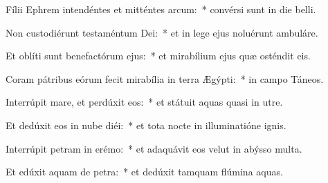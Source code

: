 
\item Fílii Ephrem intendéntes et mitténtes arcum:~* convérsi sunt in die belli.

\item Non custodiérunt testaméntum Dei:~* et in lege ejus noluérunt ambuláre.

\item Et oblíti sunt benefactórum ejus:~* et mirabílium ejus quæ osténdit eis.

\item Coram pátribus eórum fecit mirabília in terra Ægýpti:~* in campo Táneos.

\item Interrúpit mare, et perdúxit eos:~* et státuit aquas quasi in utre.

\item Et dedúxit eos in nube diéi:~* et tota nocte in illuminatióne ignis.

\item Interrúpit petram in erémo:~* et adaquávit eos velut in abýsso multa.

\item Et edúxit aquam de petra:~* et dedúxit tamquam flúmina aquas.
